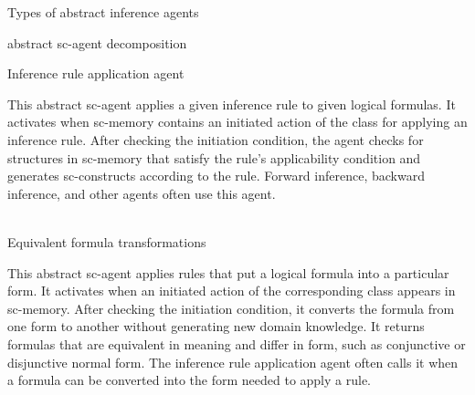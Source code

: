 \begin{frame}{Types of abstract inference agents}
\topline
\justifying
\vspace{10mm}

\begin{SCn}
\begin{scnrelfromset}{abstract sc-agent decomposition}
\end{scnrelfromset}
\begin{scnindent}
\end{scnindent}
\end{SCn}
\end{frame}

\begin{frame}{Inference rule application agent}
\topline
\justifying
\vspace{10mm}

  This abstract sc-agent applies a given inference rule to given logical formulas. It activates when sc-memory contains an initiated action of the class for applying an inference rule. After checking the initiation condition, the agent checks for structures in sc-memory that satisfy the rule's applicability condition and generates sc-constructs according to the rule. Forward inference, backward inference, and other agents often use this agent.
\end{frame}


\begin{frame}{\\Equivalent formula transformations}
\topline
\justifying
\vspace{10mm}

  This abstract sc-agent applies rules that put a logical formula into a particular form. It activates when an initiated action of the corresponding class appears in sc-memory. After checking the initiation condition, it converts the formula from one form to another without generating new domain knowledge. It returns formulas that are equivalent in meaning and differ in form, such as conjunctive or disjunctive normal form. The inference rule application agent often calls it when a formula can be converted into the form needed to apply a rule.
\end{frame}

